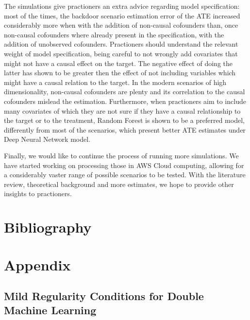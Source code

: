 \documentclass{article}
\numberwithin{equation}{section}
\begin{document}
The simulations give practioners an extra advice regarding model specification: most of the times, the backdoor scenario estimation error of the ATE increased considerably more when with the addition of non-causal cofounders than, once non-causal cofounders where already present in the specification, with the addition of unobserved cofounders. Practioners should understand the relevant weight of model specification, being careful to not wrongly add covariates that might not have a causal effect on the target. The negative effect of doing the latter has shown to be greater then the effect of not including variables which might have a causal relation to the target. In the modern scenarios of high dimensionality, non-causal cofounders are plenty and its correlation to the causal cofounders mislead the estimation. Furthermore, when practioners aim to include many covariates of which they are not sure if they have a causal relationship to the target or to the treatment, Random Forest is shown to be a preferred model, differently from most of the scenarios, which present better ATE estimates under Deep Neural Network model.

Finally, we would like to continue the process of running more simulations. We have started working on processing those in AWS Cloud computing, allowing for a considerably vaster range of possible scenarios to be tested. With the literature review, theoretical background and more estimates, we hope to provide other insights to practioners.

\newpage

\section{Bibliography}



\newpage

\section{Appendix}

\subsection{Mild Regularity Conditions for Double Machine Learning}
\label{subsec:appendix_mild_regularity_conditions_for_dml}
\end{document}
